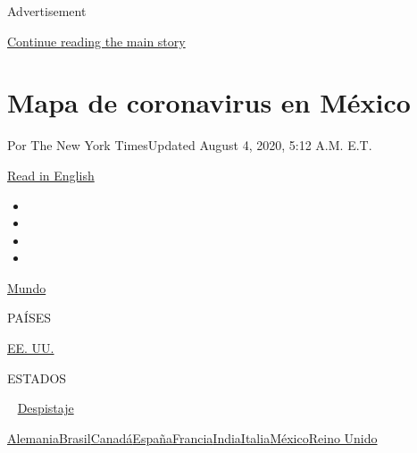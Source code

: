 Advertisement

\protect\hyperlink{after-top}{Continue reading the main story}

\hypertarget{mapa-de-coronavirus-en-muxe9xico}{%
\section{Mapa de coronavirus en
México}\label{mapa-de-coronavirus-en-muxe9xico}}

Por The New York TimesUpdated August 4, 2020, 5:12 A.M. E.T.

\href{https://www.nytimes.com/interactive/2020/world/americas/mexico-coronavirus-cases.html}{Read
in English}

\begin{itemize}
\item
\item
\item
\item
\end{itemize}

\href{https://www.nytimes.com/interactive/2020/world/coronavirus-maps.html}{Mundo}~

PAÍSES

\textbar{}
\href{https://www.nytimes.com/es/interactive/2020/espanol/mundo/coronavirus-en-estados-unidos.html}{EE.
UU.}~

ESTADOS

~
\href{https://www.nytimes.com/interactive/2020/us/coronavirus-testing.html}{Despistaje}

\href{https://www.nytimes.com/interactive/2020/world/europe/germany-coronavirus-cases.html}{Alemania}\href{https://www.nytimes.com/interactive/2020/world/americas/brazil-coronavirus-cases.html}{Brasil}\href{https://www.nytimes.com/interactive/2020/world/canada/canada-coronavirus-cases.html}{Canadá}\href{https://www.nytimes.com/interactive/2020/world/europe/spain-coronavirus-cases.html}{España}\href{https://www.nytimes.com/interactive/2020/world/europe/france-coronavirus-cases.html}{Francia}\href{https://www.nytimes.com/interactive/2020/world/asia/india-coronavirus-cases.html}{India}\href{https://www.nytimes.com/interactive/2020/world/europe/italy-coronavirus-cases.html}{Italia}\href{https://www.nytimes.com/es/interactive/2020/espanol/america-latina/coronavirus-en-mexico.html}{México}\href{https://www.nytimes.com/interactive/2020/world/europe/united-kingdom-coronavirus-cases.html}{Reino
Unido}

